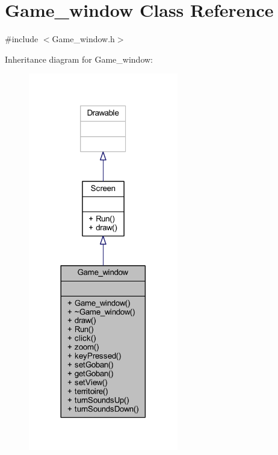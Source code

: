 \hypertarget{class_game__window}{}\section{Game\+\_\+window Class Reference}
\label{class_game__window}


{\ttfamily \#include $<$Game\+\_\+window.\+h$>$}



Inheritance diagram for Game\+\_\+window\+:
\nopagebreak
\begin{figure}[H]
\begin{center}
\leavevmode
\includegraphics[width=185pt]{class_game__window__inherit__graph}
\end{center}
\end{figure}


